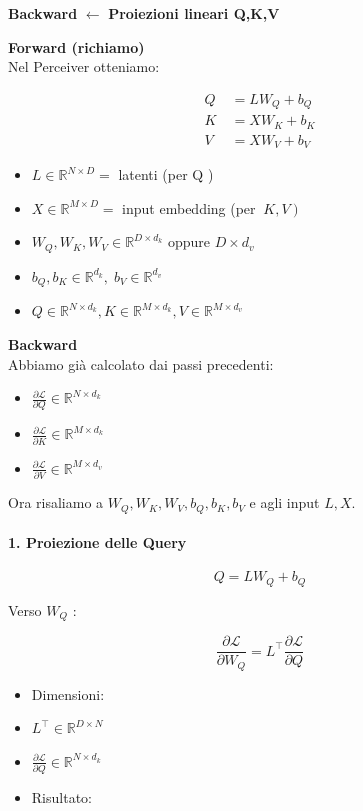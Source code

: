 \documentclass[
  11pt,
]{article}
\newcommand{\currentstep}[1]{%
\begin{tcolorbox}[colback=red!3, colframe=red!40!black, boxrule=0.3pt, arc=2pt,
  left=4pt, right=4pt, top=2pt, bottom=2pt]
{\footnotesize\textbf{Backward} $\longleftarrow$ \textbf{#1}}
\end{tcolorbox}}
\begin{document}
\currentstep{Proiezioni lineari Q,K,V}

\textbf{Forward (richiamo)}\\
Nel Perceiver otteniamo:

\[\begin{matrix}
Q & \  = LW_{Q} + b_{Q} \\
K & \  = XW_{K} + b_{K} \\
V & \  = XW_{V} + b_{V}
\end{matrix}\]

\begin{itemize}
\item
  \(L \in \mathbb{R}^{N \times D} =\) latenti (per Q )
\item
  \(X \in \mathbb{R}^{M \times D} =\) input embedding (per
  \(\left. \ K,V \right)\)
\item
  \(W_{Q},W_{K},W_{V} \in \mathbb{R}^{D \times d_{k}}\) oppure
  \(D \times d_{v}\)
\item
  \(b_{Q},b_{K} \in \mathbb{R}^{d_{k}},\; b_{V} \in \mathbb{R}^{d_{v}}\)
\item
  \(Q \in \mathbb{R}^{N \times d_{k}},K \in \mathbb{R}^{M \times d_{k}},V \in \mathbb{R}^{M \times d_{v}}\)
\end{itemize}

\textbf{Backward}\\
Abbiamo già calcolato dai passi precedenti:

\begin{itemize}
\item
  \(\frac{\partial\mathcal{L}}{\partial Q} \in \mathbb{R}^{N \times d_{k}}\)
\item
  \(\frac{\partial\mathcal{L}}{\partial K} \in \mathbb{R}^{M \times d_{k}}\)
\item
  \(\frac{\partial\mathcal{L}}{\partial V} \in \mathbb{R}^{M \times d_{v}}\)
\end{itemize}

Ora risaliamo a \(W_{Q},W_{K},W_{V},b_{Q},b_{K},b_{V}\) e agli input
\(L,X\).

\paragraph{1. Proiezione delle Query}

\[Q = LW_{Q} + b_{Q}\]

Verso \(W_{Q}\) :

\[\frac{\partial\mathcal{L}}{\partial W_{Q}} = L^{\top}\frac{\partial\mathcal{L}}{\partial Q}\]

\begin{itemize}
\item
  Dimensioni:
\item
  \(L^{\top} \in \mathbb{R}^{D \times N}\)
\item
  \(\frac{\partial\mathcal{L}}{\partial Q} \in \mathbb{R}^{N \times d_{k}}\)
\item
  Risultato:
\end{itemize}
\end{document}
